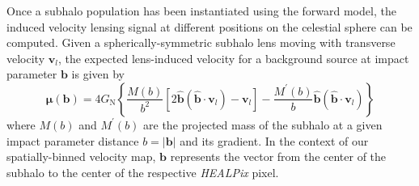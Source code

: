 \documentclass[twocolumn,linenumbers,anonymous]{aastex631}
\newcommand{\package}[1]{\textsl{#1}\xspace}
\newcommand{\healpix}{\package{HEALPix}}
\newcommand{\changes}[1]{{{\color{red}#1}}}
\begin{document}
\changes{Once a subhalo population has been instantiated using the forward model, the induced velocity lensing signal at different positions on the celestial sphere can be computed.} Given a spherically-symmetric subhalo lens moving with transverse velocity $\mathbf{v}_{l}$, the expected lens-induced velocity for a \changes{background source} at impact parameter $\mathbf{b}$ is given by~\citep{VanTilburg:2018ykj}
\begin{equation}
\boldsymbol{\mu}(\mathbf{b})=4 G_{\mathrm{N}}\left\{\frac{M(b)}{b^{2}}\left[2 \hat{\mathbf{b}}\left(\hat{\mathbf{b}} \cdot \mathbf{v}_{l}\right)-\mathbf{v}_{l}\right]-\frac{M^{\prime}(b)}{b} \hat{\mathbf{b}}\left(\hat{\mathbf{b}} \cdot \mathbf{v}_{l}\right)\right\}
\end{equation}
where $M(b)$ and $M^{\prime}(b)$ are the projected mass of the subhalo at a given impact parameter distance $b = |\mathbf{b}|$ and its gradient. \changes{In the context of our spatially-binned velocity map, $\mathbf{b}$ represents the vector from the center of the subhalo to the center of the respective \healpix pixel.}



\end{document}
